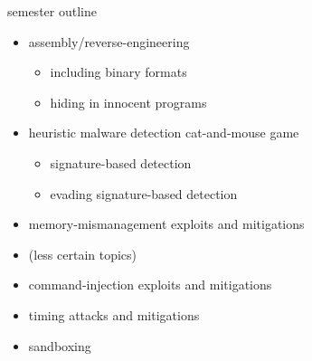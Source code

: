 \begin{frame}{semester outline}
    \begin{itemize}
    \item assembly/reverse-engineering
        \begin{itemize}
        \item including binary formats
        \item hiding in innocent programs
        \end{itemize}
    \item heuristic malware detection cat-and-mouse game
        \begin{itemize}
        \item signature-based detection
        \item evading signature-based detection
        \end{itemize}
    \item memory-mismanagement exploits and mitigations
    \vspace{.5cm}
    \item (less certain topics)
    \item command-injection exploits and mitigations
    \item timing attacks and mitigations
    \item sandboxing
    \end{itemize}
\end{frame}
